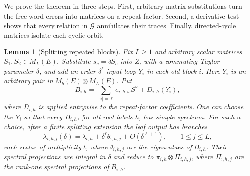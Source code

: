 \documentclass[11pt]{article}
\newtheorem{lemma}[theorem]{Lemma}
\theoremstyle{definition}
\theoremstyle{remark}
\numberwithin{equation}{section}
\begin{document}
We prove the theorem in three steps. First, arbitrary matrix
substitutions turn the free-word errors into matrices on a repeat
factor. Second, a derivative test shows that every relation in
\(\mathcal G\) annihilates their traces. Finally, directed-cycle
matrices isolate each cyclic orbit.

\begin{lemma}[Splitting repeated blocks]
\label{lem:repeated-splitting}
Fix \(L\geq1\) and arbitrary scalar matrices
\(S_1,S_2\in M_L(E)\). Substitute \(s_c=\delta S_c\) into
\(Z\), with a commuting Taylor parameter \(\delta\), and add
an order-\(\delta^\ell\) input loop \(Y_i\) in each old block
\(i\). Here \(Y_i\) is an arbitrary pair in
\(M_b(E)\otimes M_L(E)\). Put
\[
 B_{i,h}=\sum_{|\omega|=\ell}
 e_{i,h,\omega}S^\omega+D_{i,h}(Y_i),
\]
where \(D_{i,h}\) is applied entrywise to the repeat-factor
coefficients. One can choose the \(Y_i\) so that every \(B_{i,h}\),
for all root labels \(h\), has simple spectrum. For such a choice,
after a finite splitting extension the leaf output has branches
\[
 \lambda_{i,h,j}(\delta)
 =\lambda_{i,h}+\delta^\ell\theta_{i,h,j}
    +O(\delta^{\ell+1}),\qquad 1\leq j\leq L,
\]
each scalar of multiplicity \(t\), where \(\theta_{i,h,j}\)
are the eigenvalues of \(B_{i,h}\). Their spectral projections
are integral in \(\delta\) and reduce to
\(\pi_{i,h}\otimes\Pi_{i,h,j}\), where
\(\Pi_{i,h,j}\) are the rank-one spectral projections of
\(B_{i,h}\).
\end{lemma}
\end{document}
